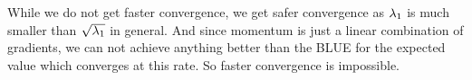 \begin{remark}
	While we do not get faster convergence, we get safer convergence as \(\lambda_1\)
	is much smaller than \(\sqrt{\lambda_1}\) in general. And since momentum
	is just a linear combination of gradients, we can not achieve anything better
	than the BLUE for the expected value which converges at this rate. So
	faster convergence is impossible.
\end{remark}







\endinput
